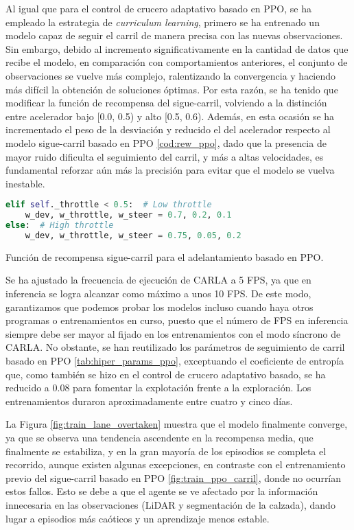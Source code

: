 Al igual que para el control de crucero adaptativo basado en \ac{PPO}, se ha empleado la estrategia de \textit{curriculum learning}, primero se ha entrenado un modelo capaz de seguir el carril de manera precisa con las nuevas observaciones. Sin embargo, debido al incremento significativamente en la cantidad de datos que recibe el modelo, en comparación con comportamientos anteriores, el conjunto de observaciones se vuelve más complejo, ralentizando la convergencia y haciendo más difícil la obtención de soluciones óptimas. Por esta razón, se ha tenido que modificar la función de recompensa del sigue-carril, volviendo a la distinción entre acelerador bajo [0.0, 0.5) y alto [0.5, 0.6). Además, en esta ocasión se ha incrementado el peso de la desviación y reducido el del acelerador respecto al modelo sigue-carril basado en \ac{PPO} \ref{cod:rew_ppo}, dado que la presencia de mayor ruido dificulta el seguimiento del carril, y más a altas velocidades, es fundamental reforzar aún más la precisión para evitar que el modelo se vuelva inestable.

\begin{code}[h]
\begin{lstlisting}[language=Python]
elif self._throttle < 0.5:  # Low throttle
    w_dev, w_throttle, w_steer = 0.7, 0.2, 0.1
else:  # High throttle
    w_dev, w_throttle, w_steer = 0.75, 0.05, 0.2
\end{lstlisting}
\caption[Función de recompensa sigue-carril para el adelantamiento basado en \ac{PPO}]{Función de recompensa sigue-carril para el adelantamiento basado en \ac{PPO}.}
\label{cod:rew_ppo_lane_overtaken}
\end{code}

\newpage

Se ha ajustado la frecuencia de ejecución de CARLA a 5 \ac{FPS}, ya que en inferencia se logra alcanzar como máximo a unos 10 \ac{FPS}. De este modo, garantizamos que podemos probar los modelos incluso cuando haya otros programas o entrenamientos en curso, puesto que el número de \ac{FPS} en inferencia siempre debe ser mayor al fijado en los entrenamientos con el modo síncrono de CARLA. No obstante, se han reutilizado los parámetros de seguimiento de carril basado en \ac{PPO} \ref{tab:hiper_params_ppo}, exceptuando el coeficiente de entropía que, como también se hizo en el control de crucero adaptativo basado, se ha reducido a 0.08 para fomentar la explotación frente a la exploración. Los entrenamientos duraron aproximadamente entre cuatro y cinco días.

La Figura \ref{fig:train_lane_overtaken} muestra que el modelo finalmente converge, ya que 
se observa una tendencia ascendente en la recompensa media, que finalmente se estabiliza, y
en la gran mayoría de los episodios se completa el recorrido, aunque existen algunas excepciones, en contraste con el entrenamiento previo del sigue-carril basado en \ac{PPO} \ref{fig:train_ppo_carril}, donde no ocurrían estos fallos. Esto se debe a que el agente se ve afectado por la información innecesaria en las observaciones (\ac{LiDAR} y segmentación de la calzada), dando lugar a episodios más caóticos y un aprendizaje menos estable.

